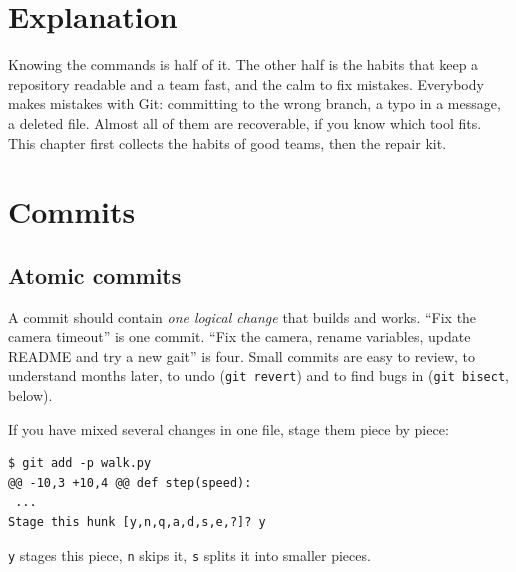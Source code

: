 \label{ch:git4}

\section*{Explanation}
Knowing the commands is half of it. The other half is the habits that keep a repository readable and a team fast, and the calm to fix mistakes. Everybody makes mistakes with Git: committing to the wrong branch, a typo in a message, a deleted file. Almost all of them are recoverable, if you know which tool fits. This chapter first collects the habits of good teams, then the repair kit.

\section*{Commits}
\subsection*{Atomic commits}
A commit should contain \emph{one logical change} that builds and works. ``Fix the camera timeout'' is one commit. ``Fix the camera, rename variables, update README and try a new gait'' is four. Small commits are easy to review, to understand months later, to undo (\texttt{git revert}) and to find bugs in (\texttt{git bisect}, below).

If you have mixed several changes in one file, stage them piece by piece:
\begin{verbatim}
$ git add -p walk.py
@@ -10,3 +10,4 @@ def step(speed):
 ...
Stage this hunk [y,n,q,a,d,s,e,?]? y
\end{verbatim}
\texttt{y} stages this piece, \texttt{n} skips it, \texttt{s} splits it into smaller pieces.

